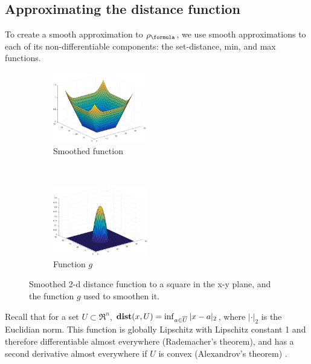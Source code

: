 \subsection{Approximating the distance function}
\label{sec:dist smoothing}
To create a smooth approximation to $\robf$, we use smooth approximations to each of its non-differentiable components: the set-distance, min, and max functions.

\begin{figure}[t!]
	\centering
	\begin{subfigure}[t]{0.25\textwidth}
		\includegraphics[height=1.2in]{figures/smoothDist2d}
		\caption{Smoothed function}
	\end{subfigure}%
	~
	\begin{subfigure}[t]{0.25\textwidth}
		\includegraphics[height=1.2in]{figures/kernelG}
		\caption{Function $g$}
	\end{subfigure}
	\caption{{\small Smoothed 2-d distance function to a square in the x-y plane, and the function $g$ used to smoothen it.}}
	\vspace{-10pt}
	\label{fig:smooth2d}
\end{figure}

Recall that for a set $U \subset \Re^n$, $\mathbf{dist}(x,U) = \inf_{a \in \overline{U}} |x-a|_2$, where $|\cdot|_2$ is the Euclidian norm.
This function is globally Lipschitz with Lipschitz constant 1 and therefore differentiable almost everywhere (Rademacher's theorem), and has a second derivative almost everywhere if $U$ is convex (Alexandrov's theorem) \cite{MakelaN92book}.

